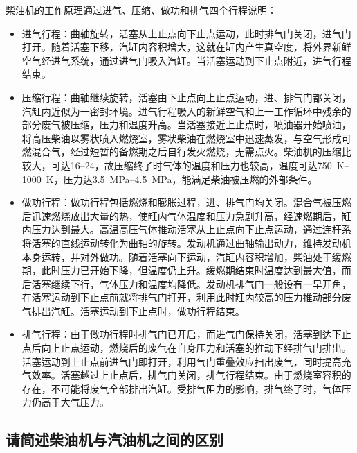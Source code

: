 \documentclass[UTF8]{ctexart}
\numberwithin{figure}{section}
\numberwithin{table}{section}
\begin{document}
柴油机的工作原理通过进气、压缩、做功和排气四个行程说明：

\begin{itemize}
	\item 进气行程：曲轴旋转，活塞从上止点向下止点运动，此时排气门关闭，进气门打开。随着活塞下移，汽缸内容积增大，这就在缸内产生真空度，将外界新鲜空气经进气系统，通过进气门吸入汽缸。当活塞运动到下止点附近，进气行程结束。

	\item 压缩行程：曲轴继续旋转，活塞由下止点向上止点运动，进、排气门都关闭，汽缸内近似为一密封环境。进气行程吸入的新鲜空气和上一工作循环中残余的部分废气被压缩，压力和温度升高。当活塞接近上止点时，喷油器开始喷油，将高压柴油以雾状喷入燃烧室，雾状柴油在燃烧室中迅速蒸发，与空气形成可燃混合气，经过短暂的备燃期之后自行发火燃烧，无需点火。柴油机的压缩比较大，可达\numrange[range-phrase = $\,\sim\,$]{16}{24}，故压缩终了时气体的温度和压力也较高，温度可达\qtyrange[range-phrase = $\,\sim\,$, range-units = single]{750}{1000}{\kelvin}，压力达\qtyrange[range-phrase = $\,\sim\,$, range-units = single]{3.5}{4.5}{\mega\pascal}，能满足柴油被压燃的外部条件。

	\item 做功行程：做功行程包括燃烧和膨胀过程，进、排气门均关闭。混合气被压燃后迅速燃烧放出大量的热，使缸内气体温度和压力急剧升高，经速燃期后，缸内压力达到最大。高温高压气体推动活塞从上止点向下止点运动，通过连杆系将活塞的直线运动转化为曲轴的旋转。发动机通过曲轴输出动力，维持发动机本身运转，并对外做功。随着活塞向下运动，汽缸内容积增加，柴油处于缓燃期，此时压力已开始下降，但温度仍上升。缓燃期结束时温度达到最大值，而后活塞继续下行，气体压力和温度均降低。发动机排气门一般设有一早开角，在活塞运动到下止点前就将排气门打开，利用此时缸内较高的压力推动部分废气排出汽缸。活塞运动到下止点时，做功行程结束。

	\item 排气行程：由于做功行程时排气门已开启，而进气门保持关闭，活塞到达下止点后向上止点运动，燃烧后的废气在自身压力和活塞的推动下经排气门排出。活塞运动到上止点前进气门即打开，利用气门重叠效应扫出废气，同时提高充气效率。活塞越过上止点后，排气门关闭，排气行程结束。由于燃烧室容积的存在，不可能将废气全部排出汽缸。受排气阻力的影响，排气终了时，气体压力仍高于大气压力。
\end{itemize}

\subsection{请简述柴油机与汽油机之间的区别}
\end{document}
